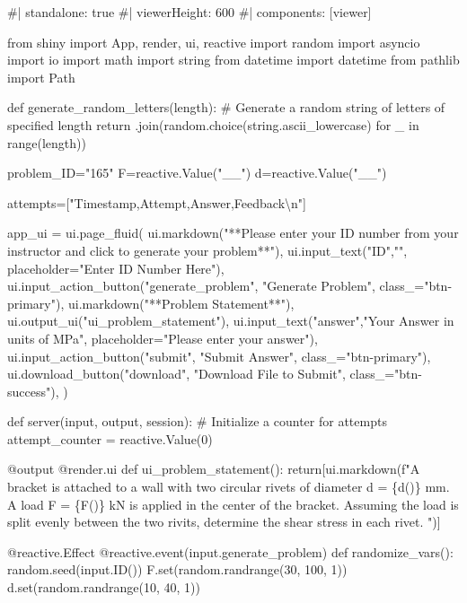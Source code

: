 \documentclass[
  letterpaper,
  DIV=11,
  numbers=noendperiod]{scrreprt}
\newenvironment{Shaded}{\begin{snugshade}}{\end{snugshade}}
\newcommand{\NormalTok}[1]{\textcolor[rgb]{0.00,0.23,0.31}{#1}}
\begin{document}
\begin{Shaded}
\begin{Highlighting}[]
\NormalTok{\#| standalone: true}
\NormalTok{\#| viewerHeight: 600}
\NormalTok{\#| components: [viewer]}

\NormalTok{from shiny import App, render, ui, reactive}
\NormalTok{import random}
\NormalTok{import asyncio}
\NormalTok{import io}
\NormalTok{import math}
\NormalTok{import string}
\NormalTok{from datetime import datetime}
\NormalTok{from pathlib import Path}

\NormalTok{def generate\_random\_letters(length):}
\NormalTok{    \# Generate a random string of letters of specified length}
\NormalTok{    return \textquotesingle{}\textquotesingle{}.join(random.choice(string.ascii\_lowercase) for \_ in range(length))}

\NormalTok{problem\_ID="165"}
\NormalTok{F=reactive.Value("\_\_")}
\NormalTok{d=reactive.Value("\_\_")}


\NormalTok{attempts=["Timestamp,Attempt,Answer,Feedback\textbackslash{}n"]}

\NormalTok{app\_ui = ui.page\_fluid(}
\NormalTok{    ui.markdown("**Please enter your ID number from your instructor and click to generate your problem**"),}
\NormalTok{    ui.input\_text("ID","", placeholder="Enter ID Number Here"),}
\NormalTok{    ui.input\_action\_button("generate\_problem", "Generate Problem", class\_="btn{-}primary"),}
\NormalTok{    ui.markdown("**Problem Statement**"),}
\NormalTok{    ui.output\_ui("ui\_problem\_statement"),}
\NormalTok{    ui.input\_text("answer","Your Answer in units of MPa", placeholder="Please enter your answer"),}
\NormalTok{    ui.input\_action\_button("submit", "Submit Answer", class\_="btn{-}primary"),}
\NormalTok{    ui.download\_button("download", "Download File to Submit", class\_="btn{-}success"),}
\NormalTok{)}


\NormalTok{def server(input, output, session):}
\NormalTok{    \# Initialize a counter for attempts}
\NormalTok{    attempt\_counter = reactive.Value(0)}

\NormalTok{    @output}
\NormalTok{    @render.ui}
\NormalTok{    def ui\_problem\_statement():}
\NormalTok{        return[ui.markdown(f"A bracket is attached to a wall with two circular rivets of diameter d = \{d()\} mm. A load F = \{F()\} kN is applied in the center of the bracket. Assuming the load is split evenly between the two rivits, determine the shear stress in each rivet. ")]}
    
\NormalTok{    @reactive.Effect}
\NormalTok{    @reactive.event(input.generate\_problem)}
\NormalTok{    def randomize\_vars():}
\NormalTok{        random.seed(input.ID())}
\NormalTok{        F.set(random.randrange(30, 100, 1))}
\NormalTok{        d.set(random.randrange(10, 40, 1))}
        


\end{Highlighting}
\end{Shaded}
\end{document}
